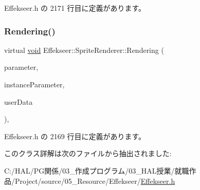  Effekseer.\+h の 2171 行目に定義があります。

\mbox{\label{class_effekseer_1_1_sprite_renderer_a8e3f9a32bb103082e32a754fd689bbef}} 
\subsubsection{\texorpdfstring{Rendering()}{Rendering()}}
{\footnotesize\ttfamily virtual \mbox{\hyperlink{namespace_effekseer_ab34c4088e512200cf4c2716f168deb56}{void}} Effekseer\+::\+Sprite\+Renderer\+::\+Rendering (\begin{DoxyParamCaption}\item[{const \mbox{\hyperlink{struct_effekseer_1_1_sprite_renderer_1_1_node_parameter}{Node\+Parameter}} \&}]{parameter,  }\item[{const \mbox{\hyperlink{struct_effekseer_1_1_sprite_renderer_1_1_instance_parameter}{Instance\+Parameter}} \&}]{instance\+Parameter,  }\item[{\mbox{\hyperlink{namespace_effekseer_ab34c4088e512200cf4c2716f168deb56}{void}} $\ast$}]{user\+Data }\end{DoxyParamCaption})\hspace{0.3cm}{\ttfamily [inline]}, {\ttfamily [virtual]}}



 Effekseer.\+h の 2169 行目に定義があります。



このクラス詳解は次のファイルから抽出されました\+:\begin{DoxyCompactItemize}
\item 
C\+:/\+H\+A\+L/\+P\+G関係/03\+\_\+作成プログラム/03\+\_\+\+H\+A\+L授業/就職作品/\+Project/source/05\+\_\+\+Resource/\+Effekseer/\mbox{\hyperlink{_effekseer_8h}{Effekseer.\+h}}\end{DoxyCompactItemize}
